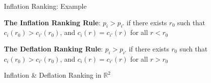 \documentclass[xcolor=dvipsnames]{beamer}
\begin{document}
\begin{frame}{Inflation Ranking: Example}
\begin{figure}
\end{figure}
\end{frame}
\begin{frame}
\textbf{The Inflation Ranking Rule}:  $p_{i} > p_{i'}$ if there exists $r_0$ such that
$c_{i}(r_0) > c_{i'}(r_0)$, and $c_{i}(r) = c_{i'}(r)$ for all {\color{red}$r \mathbf{<} r_0$}

\vspace{5em}

\textbf{The Deflation Ranking Rule}:  $p_{i} > p_{i'}$ if there exists $r_0$ such that
  $c_{i}(r_0) > c_{i'}(r_0)$, and $c_{i}(r) = c_{i'}(r)$ for all {\color{red}$r \mathbf{>} r_0$}
\end{frame}


\begin{frame}{Inflation \& Deflation Ranking in $\mathbb{R}^2$}
\begin{figure}
\end{figure}
\end{frame}
\end{document}
